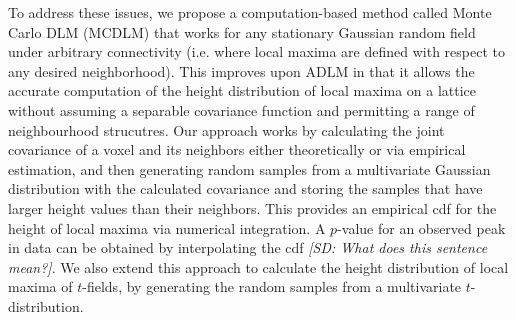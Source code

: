 \documentclass{article}
\newcommand{\sdcom}[1]{\textit{\color{red} [SD: #1]}}
\begin{document}
To address these issues, we propose a computation-based method called Monte Carlo DLM (MCDLM) that works for any stationary Gaussian random field under arbitrary connectivity (i.e. where local maxima are defined with respect to any desired neighborhood). This improves upon ADLM in that it  allows the accurate computation of the height distribution of local maxima on a lattice without assuming a separable covariance function and permitting a range of neighbourhood strucutres. Our approach works by calculating the joint covariance of a voxel and its neighbors either theoretically or via empirical estimation, and then generating random samples from a multivariate Gaussian distribution with the calculated covariance and storing the samples that have larger height values than their neighbors. This provides an empirical cdf for the height of local maxima via numerical integration. A $p$-value for an observed peak in data can be obtained by interpolating the cdf \sdcom{What does this sentence mean?}. We also extend this approach to calculate the height distribution of local maxima of $t$-fields, by generating the random samples from a multivariate $t$-distribution.


\end{document}
